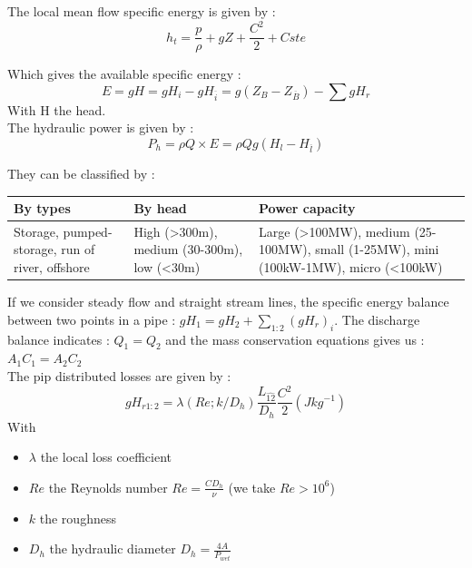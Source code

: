 \documentclass[../main.tex]{subfiles}
\begin{document}
The local mean flow specific energy is given by : \begin{equation}
    h_t = \frac{p}{\rho} + gZ + \frac{C^2}{2} + Cste
\end{equation}

Which gives the available specific energy : \begin{equation}
    E = gH = gH_i - gH_{\overline{i}} = g(Z_B - Z_{\overline{B}}) - \sum gH_r
\end{equation}
With H the head.\\

The hydraulic power is given by : \begin{equation}
    P_h = \rho Q \times E = \rho Q g(H_l - H_{\overline{l}})
\end{equation}

They can be classified by : \begin{table}[hbt!]
    \centering
    \begin{tabular}{p{}|p{}|p{}}
        By types & By head & Power capacity \\ \hline
        Storage, pumped-storage, run of river, offshore & High (>300m), medium (30-300m), low (<30m) & Large (>100MW), medium (25-100MW), small (1-25MW), mini (100kW-1MW), micro (<100kW)
    \end{tabular}
\end{table}

If we consider steady flow and straight stream lines, the specific energy balance between two points in a pipe : $gH_1 = gH_2 + \sum_{1:2}(gH_r)_i$. The discharge balance indicates : $Q_1 = Q_2$  and the mass conservation equations gives us : $A_1C_1 = A_2C_2$\\

The pip distributed losses are given by : \begin{equation}
    gH_{r 1:2} = \lambda(Re; k/D_h) \frac{L_{\hat{12}}}{D_h} \frac{C^2}{2} (J kg^{-1})
\end{equation}
With \begin{itemize}
    \item $\lambda$ the local loss coefficient
    \item $Re$ the Reynolds number $Re = \frac{CD_h}{\nu}$ (we take $Re>10^6$) 
    \item $k$ the roughness
    \item $D_h$ the hydraulic diameter $D_h = \frac{4A}{P_{wet}}$
\end{itemize}
\end{document}
